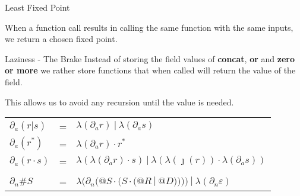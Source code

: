 \documentclass[10pt]{beamer}
\begin{document}
\begin{frame}[fragile]{Least Fixed Point}
\begin{center}
When a function call results in calling the same function with the same inputs, we return a chosen fixed point.
\end{center}
\end{frame}

\begin{frame}{Laziness - The Brake}
Instead of storing the field values of \textbf{concat}, \textbf{or} and \textbf{zero or more} we rather store functions that when called will return the value of the field.

This allows us to avoid any recursion until the value is needed.

\begin{center}
\begin{tabular}{l c l}
$\partial_a (r | s) $ & = & $\lambda(\partial_a r)\ |\  \lambda(\partial_a s) $ \\
$\partial_a (r^{*}) $ & = & $\lambda(\partial_a r) \cdot r^{*} $ \\
$\partial_a (r \cdot s) $ & = & $\lambda(\lambda(\partial_a r) \cdot s)\ |\  \lambda(\lambda(\jmath(r)) \cdot \lambda(\partial_a s)) $ \\
\\
$\partial_n \#S$ &=& $\lambda(\partial_n(@S \cdot (S \cdot ( @R\ |\ @D ))))\ |\ \lambda(\partial_n \varepsilon)$ \\
\end{tabular}
\end{center}
\end{frame}
\end{document}
